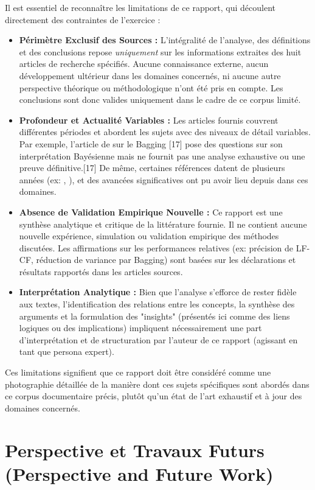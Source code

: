 \documentclass[11pt,a4paper]{article}
\begin{document}
Il est essentiel de reconnaître les limitations de ce rapport, qui découlent directement des contraintes de l'exercice :
\begin{itemize}
    \item \textbf{Périmètre Exclusif des Sources :} L'intégralité de l'analyse, des définitions et des conclusions repose \textit{uniquement} sur les informations extraites des huit articles de recherche spécifiés. Aucune connaissance externe, aucun développement ultérieur dans les domaines concernés, ni aucune autre perspective théorique ou méthodologique n'ont été pris en compte. Les conclusions sont donc valides uniquement dans le cadre de ce corpus limité.
    \item \textbf{Profondeur et Actualité Variables :} Les articles fournis couvrent différentes périodes et abordent les sujets avec des niveaux de détail variables. Par exemple, l'article de \citet{Domingos1997} sur le Bagging [17] pose des questions sur son interprétation Bayésienne mais ne fournit pas une analyse exhaustive ou une preuve définitive.[17] De même, certaines références datent de plusieurs années (ex: \citet{Wasserman2000}, \citet{Koren2011}), et des avancées significatives ont pu avoir lieu depuis dans ces domaines.
    \item \textbf{Absence de Validation Empirique Nouvelle :} Ce rapport est une synthèse analytique et critique de la littérature fournie. Il ne contient aucune nouvelle expérience, simulation ou validation empirique des méthodes discutées. Les affirmations sur les performances relatives (ex: précision de LF-CF, réduction de variance par Bagging) sont basées sur les déclarations et résultats rapportés dans les articles sources.
    \item \textbf{Interprétation Analytique :} Bien que l'analyse s'efforce de rester fidèle aux textes, l'identification des relations entre les concepts, la synthèse des arguments et la formulation des "insights" (présentés ici comme des liens logiques ou des implications) impliquent nécessairement une part d'interprétation et de structuration par l'auteur de ce rapport (agissant en tant que persona expert).
\end{itemize}

Ces limitations signifient que ce rapport doit être considéré comme une photographie détaillée de la manière dont ces sujets spécifiques sont abordés dans ce corpus documentaire précis, plutôt qu'un état de l'art exhaustif et à jour des domaines concernés.

\section{Perspective et Travaux Futurs (Perspective and Future Work)}
\end{document}
